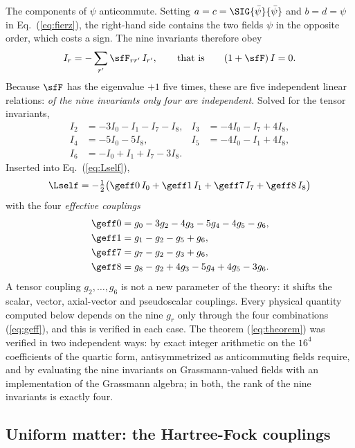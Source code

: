 The components of $\psi$ anticommute. Setting $a=c=\SIG{\bar\psi}{\bar\psi}$ and $b=d=\psi$ in
Eq.~(\ref{eq:fierz}), the right-hand side contains the two fields $\psi$ in the opposite order,
which costs a sign. The nine invariants therefore obey
\begin{equation}
I_r=-\sum_{r'}\sfF_{rr'}\,I_{r'},\qquad\text{that is}\qquad(1+\sfF)\,I=0 .
\label{eq:theorem}
\end{equation}
Because $\sfF$ has the eigenvalue $+1$ five times, these are five independent linear relations:
\emph{of the nine invariants only four are independent.} Solved for the tensor invariants,
\begin{equation}
\begin{aligned}
I_2&=-3I_0-I_1-I_7-I_8, & I_3&=-4I_0-I_7+4I_8,\\
I_4&=-5I_0-5I_8, & I_5&=-4I_0-I_1+4I_8,\\
I_6&=-I_0+I_1+I_7-3I_8 .
\end{aligned}
\label{eq:reduction}
\end{equation}
Inserted into Eq.~(\ref{eq:Lself}),
\begin{equation}
\Lself=-\tfrac12\big(\geff0\,I_0+\geff1\,I_1+\geff7\,I_7+\geff8\,I_8\big)
\label{eq:Lself4}
\end{equation}
with the four \emph{effective couplings}
\begin{equation}
\begin{aligned}
\geff0&=g_0-3g_2-4g_3-5g_4-4g_5-g_6,\\
\geff1&=g_1-g_2-g_5+g_6,\\
\geff7&=g_7-g_2-g_3+g_6,\\
\geff8&=g_8-g_2+4g_3-5g_4+4g_5-3g_6 .
\end{aligned}
\label{eq:geff}
\end{equation}
A tensor coupling $g_2,\dots,g_6$ is not a new parameter of the theory: it shifts the scalar,
vector, axial-vector and pseudoscalar couplings. Every physical quantity computed below depends on
the nine $g_r$ only through the four combinations (\ref{eq:geff}), and this is verified in each case.
The theorem (\ref{eq:theorem}) was verified in two independent ways: by exact integer arithmetic on
the $16^{4}$ coefficients of the quartic form, antisymmetrized as anticommuting fields require, and
by evaluating the nine invariants on Grassmann-valued fields with an implementation of the Grassmann
algebra; in both, the rank of the nine invariants is exactly four.

\subsection{Uniform matter: the Hartree-Fock couplings}
\label{sec:hf}

